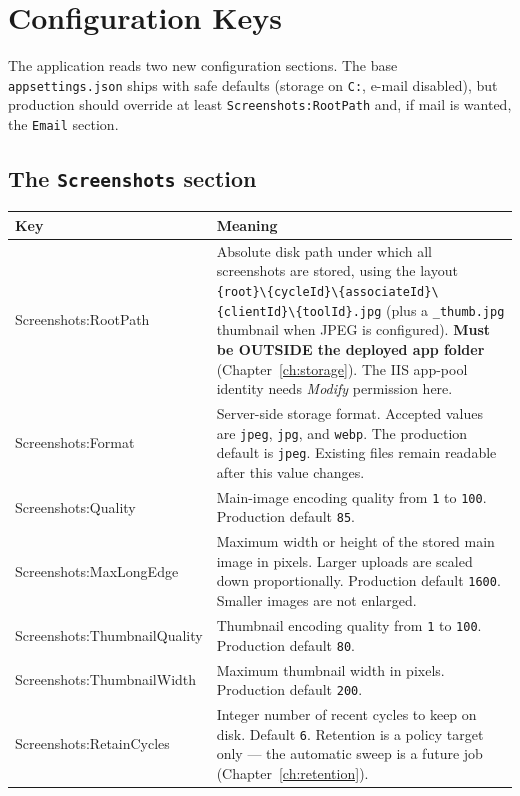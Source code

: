 \documentclass[12pt,a4paper]{report}
\begin{document}
\chapter{Configuration Keys}
\label{ch:config}

The application reads two new configuration sections. The base \texttt{appsettings.json} ships with
safe defaults (storage on \texttt{C:}, e-mail disabled), but production should override at least
\texttt{Screenshots:RootPath} and, if mail is wanted, the \texttt{Email} section.

\section{The \texttt{Screenshots} section}

\begin{longtable}{>{\ttfamily\small}p{5.8cm} >{\raggedright\arraybackslash}p{8.2cm}}
\toprule
\normalfont\textbf{Key} & \textbf{Meaning} \\
\midrule
\endhead
Screenshots:RootPath &
  Absolute disk path under which all screenshots are stored, using the layout
  \texttt{\{root\}\textbackslash\{cycleId\}\textbackslash\{associateId\}\textbackslash}
  \texttt{\{clientId\}\textbackslash\{toolId\}.jpg}
  (plus a \texttt{\_thumb.jpg} thumbnail when JPEG is configured). \textbf{Must be OUTSIDE the deployed app folder}
  (Chapter~\ref{ch:storage}). The IIS app-pool identity needs \emph{Modify} permission here. \\
Screenshots:Format &
  Server-side storage format. Accepted values are \texttt{jpeg}, \texttt{jpg}, and \texttt{webp}.
  The production default is \texttt{jpeg}. Existing files remain readable after this value changes. \\
Screenshots:Quality &
  Main-image encoding quality from \texttt{1} to \texttt{100}. Production default \texttt{85}. \\
Screenshots:MaxLongEdge &
  Maximum width or height of the stored main image in pixels. Larger uploads are scaled down
  proportionally. Production default \texttt{1600}. Smaller images are not enlarged. \\
Screenshots:ThumbnailQuality &
  Thumbnail encoding quality from \texttt{1} to \texttt{100}. Production default \texttt{80}. \\
Screenshots:ThumbnailWidth &
  Maximum thumbnail width in pixels. Production default \texttt{200}. \\
Screenshots:RetainCycles &
  Integer number of recent cycles to keep on disk. Default \texttt{6}. Retention is a policy target
  only --- the automatic sweep is a future job (Chapter~\ref{ch:retention}). \\
\bottomrule
\end{longtable}
\end{document}
